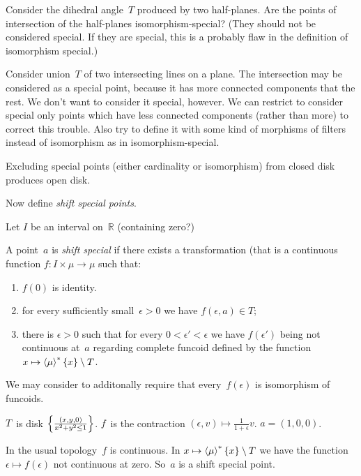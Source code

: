 
Consider the dihedral angle~$T$ produced by two half-planes. Are the points of
intersection of the half-planes isomorphism-special? (They should not
be considered special. If they are special, this is a probably flaw in
the definition of isomorphism special.)

Consider union~$T$ of two intersecting lines on a plane. The intersection
may be considered as a special point, because it has more connected
components that the rest. We don't want to consider it special, however.
We can restrict to consider special only points which have less connected
components (rather than more) to correct this trouble. Also try to define
it with some kind of morphisms of filters instead of isomorphism as in
isomorphism-special.

\begin{xca}
Excluding special points (either cardinality or isomorphism) from closed disk
produces open disk.
\end{xca}

Now define \emph{shift special points}.

Let $I$ be an interval on~$\mathbb{R}$ (containing zero?)

A point~$a$ is \emph{shift special} if there exists a transformation
(that is a continuous function $f:I\times\mu\to\mu$ such that:
\begin{enumerate}
  \item $f(0)$ is identity. 
  \item for every sufficiently small~$\epsilon>0$ we have $f(\epsilon,a)\in T$;
  \item there is $\epsilon>0$ such that for every $0<\epsilon'<\epsilon$ we have
    $f(\epsilon')$ being not continuous at~$a$ regarding complete funcoid
    defined by the function $x\mapsto\left\langle \mu\right\rangle ^{\ast}\{x\}\setminus T$.
\end{enumerate}

We may consider to additonally require that every~$f(\epsilon)$ is isomorphism
of funcoids.

\begin{example}
$T$~is disk $\left\{ \frac{(x,y,0)}{x^2+y^2\leq 1}\right\}$. $f$~is the contraction
$(\epsilon,v)\mapsto\frac{1}{1+\epsilon}v$. $a=(1,0,0)$.

In the usual topology~$f$ is continuous. In
$x\mapsto\left\langle \mu\right\rangle ^{\ast}\{x\}\setminus T$ we have the function
$\epsilon\mapsto f(\epsilon)$ not continuous at zero.
So~$a$ is a shift special point.
\end{example}

